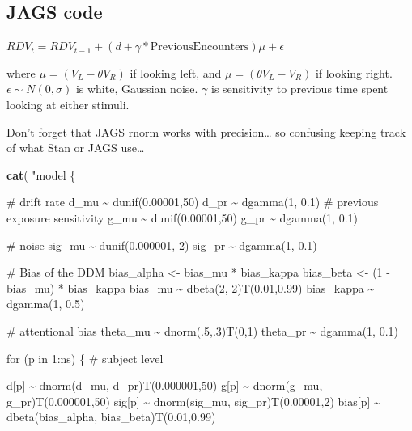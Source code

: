\documentclass[
]{book}
\newenvironment{Shaded}{\begin{snugshade}}{\end{snugshade}}
\newcommand{\FunctionTok}[1]{\textcolor[rgb]{0.13,0.29,0.53}{\textbf{#1}}}
\newcommand{\NormalTok}[1]{#1}
\newcommand{\StringTok}[1]{\textcolor[rgb]{0.31,0.60,0.02}{#1}}
\begin{document}
\hypertarget{jags-code}{%
\subsection{JAGS code}\label{jags-code}}

\(RDV_t = RDV_{t-1} + (d+\gamma*\text{PreviousEncounters})\mu+\epsilon\)

where \(\mu=(V_L-\theta V_R)\) if looking left, and \(\mu=(\theta V_L-V_R)\) if looking right. \(\epsilon \sim N(0,\sigma)\) is white, Gaussian noise. \(\gamma\) is sensitivity to previous time spent looking at either stimuli.

Don't forget that JAGS rnorm works with precision\ldots{} so confusing keeping track of what Stan or JAGS use\ldots{}

\begin{Shaded}
\begin{Highlighting}[]
\FunctionTok{cat}\NormalTok{( }\StringTok{"model \{}

\StringTok{    \# drift rate}
\StringTok{        d\_mu \textasciitilde{} dunif(0.00001,50)}
\StringTok{        d\_pr \textasciitilde{} dgamma(1, 0.1)}
\StringTok{        }
\StringTok{    \# previous exposure sensitivity}
\StringTok{        g\_mu \textasciitilde{} dunif(0.00001,50)}
\StringTok{        g\_pr \textasciitilde{} dgamma(1, 0.1)}

\StringTok{    \# noise}
\StringTok{        sig\_mu \textasciitilde{} dunif(0.000001, 2)}
\StringTok{        sig\_pr \textasciitilde{} dgamma(1, 0.1)}

\StringTok{    \# Bias of the DDM}
\StringTok{        bias\_alpha \textless{}{-} bias\_mu * bias\_kappa}
\StringTok{        bias\_beta \textless{}{-} (1 {-} bias\_mu) * bias\_kappa}
\StringTok{        bias\_mu \textasciitilde{} dbeta(2, 2)T(0.01,0.99)}
\StringTok{        bias\_kappa \textasciitilde{} dgamma(1, 0.5)}

\StringTok{    \# attentional bias}
\StringTok{        theta\_mu \textasciitilde{} dnorm(.5,.3)T(0,1)}
\StringTok{        theta\_pr \textasciitilde{} dgamma(1, 0.1)}

\StringTok{    for (p in 1:ns) \{ \# subject level}

\StringTok{        d[p] \textasciitilde{} dnorm(d\_mu, d\_pr)T(0.000001,50)}
\StringTok{        }
\StringTok{        g[p] \textasciitilde{} dnorm(g\_mu, g\_pr)T(0.000001,50)}
\StringTok{        }
\StringTok{        sig[p] \textasciitilde{} dnorm(sig\_mu, sig\_pr)T(0.00001,2)}
\StringTok{        }
\StringTok{        bias[p] \textasciitilde{} dbeta(bias\_alpha, bias\_beta)T(0.01,0.99)}


\end{Highlighting}
\end{Shaded}
\end{document}
